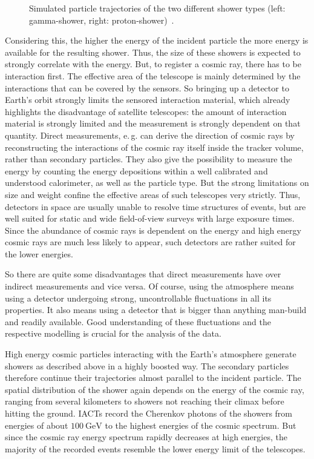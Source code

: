 \begin{figure}
\begin{subfigure}{0.475\textwidth}
    \label{fig:gamma}
  \end{subfigure}
  \caption{Simulated particle trajectories of the two different shower types (left: gamma-shower, right: proton-shower)~\cite{shower}.}
  \label{fig:shower}
\end{figure}

Considering this, the higher the energy of the incident particle the more
energy is available for the resulting shower. Thus, the size of these showers
is expected to strongly correlate with the energy. But, to register a cosmic
ray, there has to be interaction first. The effective area of the telescope
is mainly determined by the interactions that can be covered by the sensors. So
bringing up a detector to Earth's orbit strongly limits the sensored
interaction material, which already highlights the disadvantage of satellite
telescopes: the amount of interaction material is strongly limited and the
measurement is strongly dependent on that quantity. Direct measurements, e.\,g.
can derive the direction of cosmic rays by reconstructing the interactions of
the cosmic ray itself inside the tracker volume, rather than secondary
particles. They also give the possibility to measure the energy by counting the
energy depositions within a well calibrated and understood calorimeter, as well
as the particle type. But the strong limitations on size and weight confine the
effective areas of such telescopes very strictly. Thus, detectors in space are
usually unable to resolve time structures of events, but are well suited for
static and wide field-of-view surveys with large exposure times. Since the
abundance of cosmic rays is dependent on the energy and high energy cosmic rays
are much less likely to appear, such detectors are rather suited for the lower
energies.

So there are quite some disadvantages that direct measurements have over
indirect measurements and vice versa. Of course, using the atmosphere means
using a detector undergoing strong, uncontrollable fluctuations in all its
properties. It also means using a detector that is bigger than anything
man-build and readily available. Good understanding of these fluctuations and
the respective modelling is crucial for the analysis of the data.

High energy cosmic particles interacting with the Earth's atmosphere generate
showers as described above in a highly boosted way. The secondary particles
therefore continue their trajectories almost parallel to the incident particle.
The spatial distribution of the shower again depends on the energy of the
cosmic ray, ranging from several kilometers to showers not reaching their
climax before hitting the ground. IACTs record the Cherenkov photons of the
showers from energies of about $\SI{100}{\giga\electronvolt}$ to the highest
energies of the cosmic spectrum. But since the cosmic ray energy spectrum
rapidly decreases at high energies, the majority of the recorded events
resemble the lower energy limit of the telescopes.
